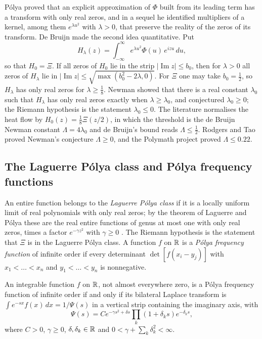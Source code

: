 P\'olya \cite{polya1926} proved that an explicit approximation of $\Phi$ built from its leading term has a transform with only real zeros, and in a sequel \cite{polya1927} he identified multipliers of a kernel, among them $e^{\lambda u^2}$ with $\lambda>0$, that preserve the reality of the zeros of its transform. De Bruijn \cite{debruijn1950} made the second idea quantitative. Put
\[
H_\lambda(z) = \int_{-\infty}^\infty e^{\lambda u^2}\Phi(u)\,e^{izu}\,du ,
\]
so that $H_0=\Xi$. If all zeros of $H_0$ lie in the strip $|\operatorname{Im}z|\le b_0$, then for $\lambda>0$ all zeros of $H_\lambda$ lie in $|\operatorname{Im}z|\le\sqrt{\max(b_0^2-2\lambda,0)}$. For $\Xi$ one may take $b_0=\frac12$, so $H_\lambda$ has only real zeros for $\lambda\ge\frac18$. Newman \cite{newman1976} showed that there is a real constant $\lambda_0$ such that $H_\lambda$ has only real zeros exactly when $\lambda\ge\lambda_0$, and conjectured $\lambda_0\ge0$; the Riemann hypothesis is the statement $\lambda_0\le0$. The literature normalises the heat flow by $H_0(z)=\frac18\Xi(z/2)$, in which the threshold is the de Bruijn Newman constant $\Lambda=4\lambda_0$ and de Bruijn's bound reads $\Lambda\le\frac12$. Rodgers and Tao \cite{rodgerstao2020} proved Newman's conjecture $\Lambda\ge0$, and the Polymath project \cite{polymath2019} proved $\Lambda\le0.22$.

\subsection{The Laguerre P\'olya class and P\'olya frequency functions}

An entire function belongs to the \emph{Laguerre P\'olya class} if it is a locally uniform limit of real polynomials with only real zeros; by the theorem of Laguerre and P\'olya these are the real entire functions of genus at most one with only real zeros, times a factor $e^{-\gamma z^2}$ with $\gamma\ge0$ \cite{levin1964}. The Riemann hypothesis is the statement that $\Xi$ is in the Laguerre P\'olya class. A function $f$ on $\mathbb{R}$ is a \emph{P\'olya frequency function} of infinite order if every determinant $\det[f(x_i-y_j)]$ with $x_1<\dots<x_n$ and $y_1<\dots<y_n$ is nonnegative.

\begin{theorem}[Schoenberg]\label{thm:ch10schoenberg}
An integrable function $f$ on $\mathbb{R}$, not almost everywhere zero, is a P\'olya frequency function of infinite order if and only if its bilateral Laplace transform is $\int e^{-sx}f(x)\,dx = 1/\Psi(s)$ in a vertical strip containing the imaginary axis, with
\[
\Psi(s) = Ce^{-\gamma s^2+\delta s}\prod_k(1+\delta_ks)e^{-\delta_ks},
\]
where $C>0$, $\gamma\ge0$, $\delta,\delta_k\in\mathbb{R}$ and $0<\gamma+\sum_k\delta_k^2<\infty$.
\end{theorem}

